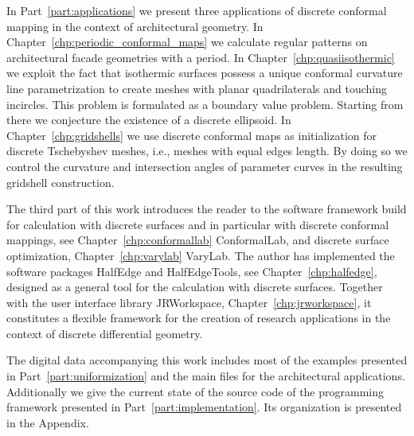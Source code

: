 \documentclass[Thesis.tex]{subfiles}
\begin{document}
In Part~\ref{part:applications} we present three applications of discrete conformal mapping in the context of architectural geometry. In Chapter~\ref{chp:periodic_conformal_maps} we calculate regular patterns on architectural facade geometries with a period. In Chapter~\ref{chp:quasiisothermic} we exploit the fact that isothermic surfaces possess a unique conformal curvature line parametrization to create meshes with planar quadrilaterals and touching incircles. This problem is formulated as a boundary value problem. Starting from there we conjecture the existence of a discrete ellipsoid. In Chapter~\ref{chp:gridshells} we use discrete conformal maps as initialization for discrete Tschebyshev meshes, i.e., meshes with equal edges length. By doing so we control the curvature and intersection angles of parameter curves in the resulting gridshell construction.

The third part of this work introduces the reader to the software framework build for calculation with discrete surfaces and in particular with discrete conformal mappings, see Chapter~\ref{chp:conformallab} {\sc ConformalLab}, and discrete surface optimization, Chapter~\ref{chp:varylab} {\sc VaryLab}. The author has implemented the software packages {\sc HalfEdge} and {\sc HalfEdgeTools}, see Chapter~\ref{chp:halfedge}, designed as a general tool for the calculation with discrete surfaces. Together with the user interface library {\sc JRWorkspace}, Chapter~\ref{chp:jrworkspace}, it constitutes a flexible framework for the creation of research applications in the context of discrete differential geometry. 

The digital data accompanying this work includes most of the examples presented in Part~\ref{part:uniformization} and the main files for the architectural applications. Additionally we give the current state of the source code of the programming framework presented in Part~\ref{part:implementation}. Its organization is presented in the Appendix.

\subfilebibliography
\end{document}
